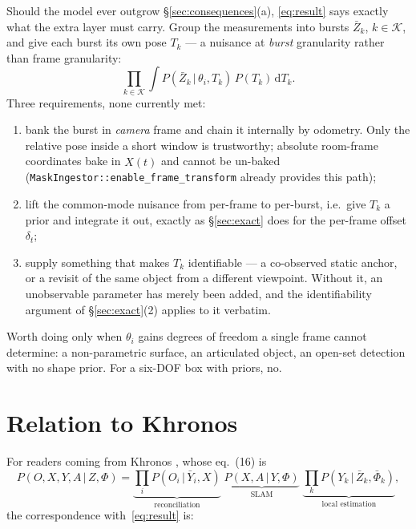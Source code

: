 \documentclass[11pt,a4paper]{report}
\newcommand{\given}{\,|\,}
\theoremstyle{definition}   %
\begin{document}
Should the model ever outgrow \S\ref{sec:consequences}(a), \eqref{eq:result} says exactly what the
extra layer must carry. Group the measurements into bursts $\bar Z_k$, $k\in\mathcal{K}$, and give
each burst its own pose $T_k$ --- a nuisance at \emph{burst} granularity rather than frame
granularity:
\begin{equation}
\prod_{k\in\mathcal{K}} \int P\!\left(\bar Z_k\given\theta_i,T_k\right)\,P\!\left(T_k\right)\,\mathrm{d}T_k .
\label{eq:burstnuisance}
\end{equation}
Three requirements, none currently met:
\begin{enumerate}[leftmargin=1.6em]
\item bank the burst in \emph{camera} frame and chain it internally by odometry. Only the
      relative pose inside a short window is trustworthy; absolute room-frame coordinates bake in
      $\hat X(t)$ and cannot be un-baked
      (\texttt{MaskIngestor::enable\_frame\_transform} already provides this path);
\item lift the common-mode nuisance from per-frame to per-burst, i.e.\ give $T_k$ a prior and
      integrate it out, exactly as \S\ref{sec:exact} does for the per-frame offset $\delta_t$;
\item supply something that makes $T_k$ identifiable --- a co-observed static anchor, or a
      revisit of the same object from a different viewpoint. Without it, an unobservable
      parameter has merely been added, and the identifiability argument of \S\ref{sec:exact}(2)
      applies to it verbatim.
\end{enumerate}
Worth doing only when $\theta_i$ gains degrees of freedom a single frame cannot determine: a
non-parametric surface, an articulated object, an open-set detection with no shape prior. For a
six-DOF box with priors, no.


\section{Relation to Khronos}
\label{sec:khronos}

For readers coming from Khronos \cite{khronos}, whose eq.~(16) is
\begin{equation}
P(O,X,Y,A\given Z,\Phi)=
\underbrace{\prod_i P(O_i\given \bar Y_i,X)}_{\text{reconciliation}}\;
\underbrace{P(X,A\given Y,\Phi)}_{\text{SLAM}}\;
\underbrace{\prod_k P(Y_k\given \bar Z_k,\bar\Phi_k)}_{\text{local estimation}} ,
\end{equation}
the correspondence with~\eqref{eq:result} is:
\end{document}
